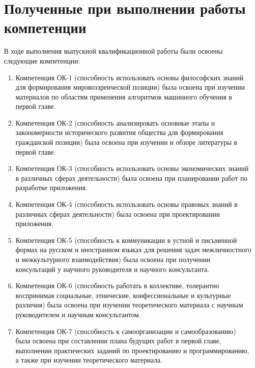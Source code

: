 \newpage
\section{\Large Полученные при выполнении работы компетенции}

\par
В ходе выполнения выпускной квалификационной работы были освоены 
следующие компетенции:

\begin{enumerate} 
  \item Компетенция ОК-1 (способность использовать основы философских знаний для формирования мировоззренческой позиции) была освоена при изучении материалов по областям применения алгоритмов машинного обучения в первой главе.
  
  \item Компетенция ОК-2 (способность анализировать основные этапы и закономерности исторического развития общества для формирования гражданской позиции) была освоена при изучении и обзоре литературы в первой главе.
  
  \item Компетенция ОК-3 (способность использовать основы экономических знаний в различных сферах деятельности) была освоена при планировании работ по разработке приложения.
  
  \item Компетенция ОК-4 (способность использовать основы правовых знаний в различных сферах деятельности) была освоена при проектировании приложения.
  
  \item Компетенция ОК-5 (способность к коммуникации в устной и письменной формах на русском и иностранном языках для решения задач межличностного и межкультурного взаимодействия) была освоена при получении консультаций у научного руководителя и научного консультанта.
  
  \item Компетенция ОК-6 (способность работать в коллективе, толерантно воспринимая социальные, этнические, конфессиональные и культурные различия) была освоена при изучении теоретического материала с научным руководителем и научным консультантом.
  
  \item Компетенция ОК-7 (способность к самоорганизации и самообразованию) была освоена при составлении плана будущих работ в первой главе, выполнении практических заданий по 
проектированию и программированию, а также при изучении теоретического материала.
  

\end{enumerate}

